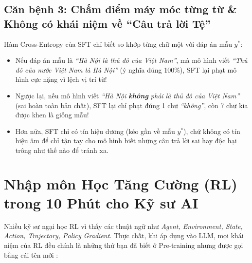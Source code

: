\subsection{Căn bệnh 3: Chấm điểm máy móc từng từ \& Không có khái niệm về ``Câu trả lời Tệ''}
Hàm Cross-Entropy của SFT chỉ biết so khớp từng chữ một với đáp án mẫu $y^*$:
\begin{itemize}[leftmargin=1.2cm]
    \item Nếu đáp án mẫu là \textit{``Hà Nội là thủ đô của Việt Nam''}, mà mô hình viết \textit{``Thủ đô của nước Việt Nam là Hà Nội''} (ý nghĩa đúng 100\%), SFT lại phạt mô hình cực nặng vì lệch vị trí từ!
    \item Ngược lại, nếu mô hình viết \textit{``Hà Nội \textbf{không} phải là thủ đô của Việt Nam''} (sai hoàn toàn bản chất), SFT lại chỉ phạt đúng 1 chữ \textit{``không''}, còn 7 chữ kia được khen là giống mẫu!
    \item Hơn nữa, SFT chỉ có tín hiệu dương (kéo gần về mẫu $y^*$), chứ không có tín hiệu âm để chỉ tận tay cho mô hình biết những câu trả lời sai hay độc hại trông như thế nào để tránh xa.
\end{itemize}

\section{Nhập môn Học Tăng Cường (RL) trong 10 Phút cho Kỹ sư AI}
\label{sec:rl_10_mins}

Nhiều kỹ sư ngại học RL vì thấy các thuật ngữ như \textit{Agent, Environment, State, Action, Trajectory, Policy Gradient}. Thực chất, khi áp dụng vào LLM, mọi khái niệm của RL đều chính là những thứ bạn đã biết ở Pre-training nhưng được gọi bằng cái tên mới \citep{sutton2018reinforcement}:

